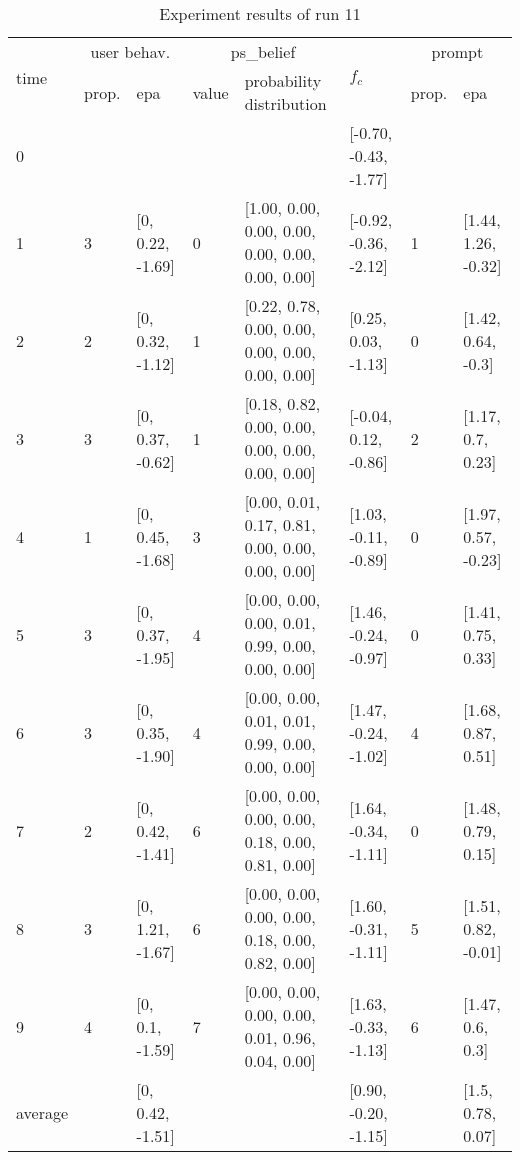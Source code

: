 \begin{table}[htbp]\footnotesize
\caption{Experiment results of run 11}
\begin{tabular}{|p{0.4cm}|p{0.6cm}|l|p{0.6cm}|p{3.3cm}|l|p{0.6cm}|l|}
\hline

\multirow{2}{*}{time} & \multicolumn{2}{c|}{user behav.} & \multicolumn{2}{c|}{ps\_belief} &
\multirow{2}{*}{$f_c$} & \multicolumn{2}{c|}{prompt} \\ \cline{2-5}\cline{ 7- 8}
& prop. & epa & value & probability distribution &  & prop. & epa \\ \hline

0 & \multicolumn{1}{l|}{} &  & \multicolumn{1}{l|}{} &  & [-0.70, -0.43, -1.77] & \multicolumn{1}{l|}{} &  \\ \hline
1 & 3 & [0, 0.22, -1.69] & 0 & [1.00, 0.00, 0.00, 0.00, 0.00, 0.00, 0.00, 0.00] & [-0.92, -0.36, -2.12] & 1 & [1.44, 1.26, -0.32] \\ \hline
2 & 2 & [0, 0.32, -1.12] & 1 & [0.22, 0.78, 0.00, 0.00, 0.00, 0.00, 0.00, 0.00] & [0.25, 0.03, -1.13] & 0 & [1.42, 0.64, -0.3] \\ \hline
3 & 3 & [0, 0.37, -0.62] & 1 & [0.18, 0.82, 0.00, 0.00, 0.00, 0.00, 0.00, 0.00] & [-0.04, 0.12, -0.86] & 2 & [1.17, 0.7, 0.23] \\ \hline
4 & 1 & [0, 0.45, -1.68] & 3 & [0.00, 0.01, 0.17, 0.81, 0.00, 0.00, 0.00, 0.00] & [1.03, -0.11, -0.89] & 0 & [1.97, 0.57, -0.23] \\ \hline
5 & 3 & [0, 0.37, -1.95] & 4 & [0.00, 0.00, 0.00, 0.01, 0.99, 0.00, 0.00, 0.00] & [1.46, -0.24, -0.97] & 0 & [1.41, 0.75, 0.33] \\ \hline
6 & 3 & [0, 0.35, -1.90] & 4 & [0.00, 0.00, 0.01, 0.01, 0.99, 0.00, 0.00, 0.00] & [1.47, -0.24, -1.02] & 4 & [1.68, 0.87, 0.51] \\ \hline
7 & 2 & [0, 0.42, -1.41] & 6 & [0.00, 0.00, 0.00, 0.00, 0.18, 0.00, 0.81, 0.00] & [1.64, -0.34, -1.11] & 0 & [1.48, 0.79, 0.15] \\ \hline
8 & 3 & [0, 1.21, -1.67] & 6 & [0.00, 0.00, 0.00, 0.00, 0.18, 0.00, 0.82, 0.00] & [1.60, -0.31, -1.11] & 5 & [1.51, 0.82, -0.01] \\ \hline
9 & 4 & [0, 0.1, -1.59] & 7 & [0.00, 0.00, 0.00, 0.00, 0.01, 0.96, 0.04, 0.00] & [1.63, -0.33, -1.13] & 6 & [1.47, 0.6, 0.3] \\ \hline
\multicolumn{1}{|l|}{average} & \multicolumn{1}{l|}{} & [0, 0.42, -1.51] & \multicolumn{1}{l|}{} &  & [0.90, -0.20, -1.15] & \multicolumn{1}{l|}{} & [1.5, 0.78, 0.07] \\ \hline
\end{tabular}
\label{}
\end{table}

